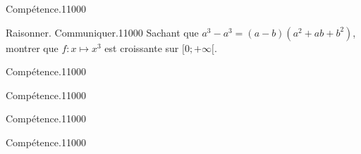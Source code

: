 \begin{pageParcourst} %

\begin{ExoCtN}{Compétence.}{1}{1}{0}{0}{0}
 
\end{ExoCtN}

\begin{ExoCtN}{Raisonner. Communiquer.}{1}{1}{0}{0}{0}
Sachant que $a^3-a^3=(a-b)(a^2+ab+b^2)$, montrer que $f:x\mapsto x^3$ est croissante sur $[0;+\infty[$.\vspace{.2cm}

 
\end{ExoCtN}

\begin{ExoCtN}{Compétence.}{1}{1}{0}{0}{0}
 
\end{ExoCtN}

\begin{ExoCtN}{Compétence.}{1}{1}{0}{0}{0}
 
\end{ExoCtN}

\begin{ExoCtN}{Compétence.}{1}{1}{0}{0}{0}
 
\end{ExoCtN}

\begin{ExoCtN}{Compétence.}{1}{1}{0}{0}{0}
 
\end{ExoCtN}
 
\end{pageParcourst} %


